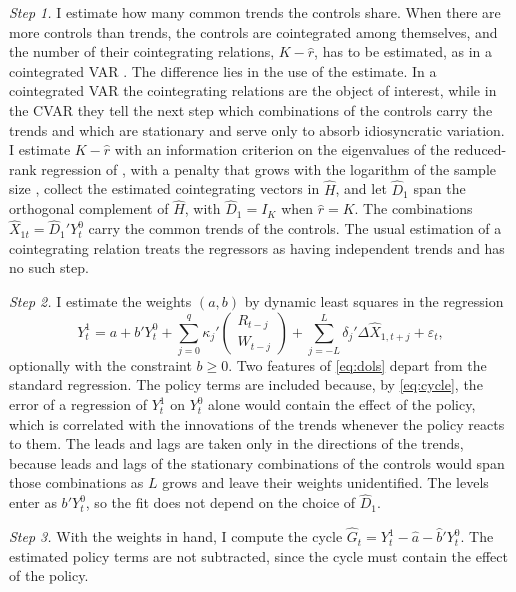 \documentclass[12pt,a4paper]{article}
\theoremstyle{definition}
\theoremstyle{definition}\newtheorem{example}{Example}
\theoremstyle{definition}\newtheorem{definition}{Definition}
\begin{document}
\textit{Step 1.} I estimate how many common trends the controls share. When there are more controls than trends, the controls are cointegrated among themselves, and the number of their cointegrating relations, $K-\hat r$, has to be estimated, as in a cointegrated VAR \citep{Johansen1991}. The difference lies in the use of the estimate. In a cointegrated VAR the cointegrating relations are the object of interest, while in the CVAR they tell the next step which combinations of the controls carry the trends and which are stationary and serve only to absorb idiosyncratic variation. I estimate $K-\hat r$ with an information criterion on the eigenvalues of the reduced-rank regression of \citet{Johansen1991}, with a penalty that grows with the logarithm of the sample size \citep{AznarSalvador2002,ChengPhillips2009}, collect the estimated cointegrating vectors in $\hat H$, and let $\hat D_1$ span the orthogonal complement of $\hat H$, with $\hat D_1=I_K$ when $\hat r=K$. The combinations $\hat X_{1t}=\hat D_1'Y^0_t$ carry the common trends of the controls. The usual estimation of a cointegrating relation treats the regressors as having independent trends and has no such step.

\textit{Step 2.} I estimate the weights $(a,b)$ by dynamic least squares \citep{Saikkonen1991,StockWatson1993} in the regression
\begin{equation}
Y^1_t=a+b'Y^0_t+\sum_{j=0}^{q}\kappa_j'\begin{pmatrix}R_{t-j}\\W_{t-j}\end{pmatrix}+\sum_{j=-L}^{L}\delta_j'\Delta\hat X_{1,t+j}+\varepsilon_t,
\label{eq:dols}
\end{equation}
optionally with the constraint $b\geq0$. Two features of \eqref{eq:dols} depart from the standard regression. The policy terms are included because, by \eqref{eq:cycle}, the error of a regression of $Y^1_t$ on $Y^0_t$ alone would contain the effect of the policy, which is correlated with the innovations of the trends whenever the policy reacts to them. The leads and lags are taken only in the directions of the trends, because leads and lags of the stationary combinations of the controls would span those combinations as $L$ grows and leave their weights unidentified. The levels enter as $b'Y^0_t$, so the fit does not depend on the choice of $\hat D_1$.

\textit{Step 3.} With the weights in hand, I compute the cycle $\hat G_t=Y^1_t-\hat a-\hat b'Y^0_t$. The estimated policy terms are not subtracted, since the cycle must contain the effect of the policy.
\end{document}
